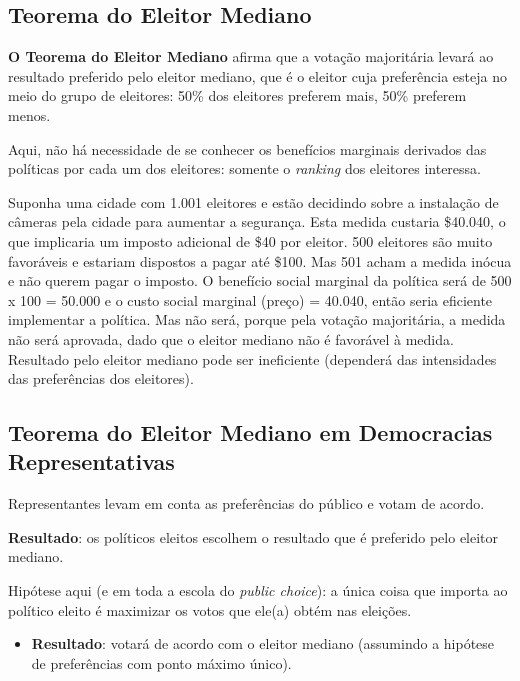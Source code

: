 \documentclass[a4paper,12pt]{article}[abntex2]
\begin{document}
\subsection{\textbf{Teorema do Eleitor Mediano}}
\textbf{O Teorema do Eleitor Mediano} afirma que a votação majoritária levará ao resultado preferido pelo eleitor mediano, que é o eleitor cuja preferência esteja no meio do grupo de eleitores: 50\% dos eleitores preferem mais, 50\% preferem menos. 

Aqui, não há necessidade de se conhecer os benefícios marginais derivados das políticas por cada um dos eleitores: somente o \textit{ranking} dos eleitores interessa. 

Suponha uma cidade com 1.001 eleitores e estão decidindo sobre a instalação de câmeras pela cidade para aumentar a segurança. Esta medida custaria \$40.040, o que implicaria um imposto adicional de \$40 por eleitor.
500 eleitores são muito favoráveis e estariam dispostos a pagar até \$100. Mas 501 acham a medida inócua e não querem pagar o imposto. O benefício social marginal da política será de 500 x 100 = 50.000 e o custo social marginal (preço) = 40.040, então seria eficiente implementar a política.  Mas não será, porque pela votação majoritária, a medida não será aprovada, dado que o eleitor mediano não é favorável à medida.  Resultado pelo eleitor mediano pode ser ineficiente (dependerá das intensidades das preferências dos eleitores). 

\subsection{\textbf{Teorema do Eleitor Mediano em Democracias Representativas}}
Representantes levam em conta as preferências do público e votam de acordo.

\textbf{Resultado}: os políticos eleitos escolhem o resultado que é preferido pelo eleitor mediano.

Hipótese aqui (e em toda a escola do \textit{public choice}): a única coisa que importa ao político eleito é maximizar os votos que ele(a) obtém nas eleições. \begin{itemize}
    \item \textbf{Resultado}: votará de acordo com o eleitor mediano (assumindo a hipótese de preferências com ponto máximo único).
\end{itemize} 
\end{document}
